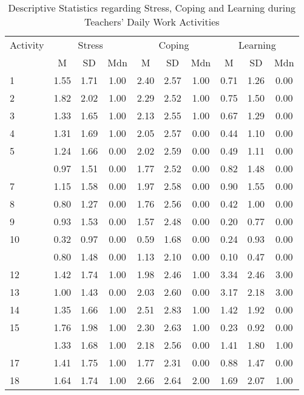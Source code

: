 \documentclass[
]{article}
\begin{document}
\begin{longtable}[t]{lccccccccc}
\caption{\label{tab:rq1 kable table}Descriptive Statistics regarding Stress, Coping and Learning during Teachers' Daily Work Activities}\\
\toprule
\multicolumn{1}{c}{Activity} & \multicolumn{3}{c}{Stress} & \multicolumn{3}{c}{Coping} & \multicolumn{3}{c}{Learning} \\
\cmidrule(l{3pt}r{3pt}){1-1} \cmidrule(l{3pt}r{3pt}){2-4} \cmidrule(l{3pt}r{3pt}){5-7} \cmidrule(l{3pt}r{3pt}){8-10}
 & M & SD & Mdn & M & SD & Mdn & M & SD & Mdn\\
\midrule
1 & 1.55 & 1.71 & 1.00 & 2.40 & 2.57 & 1.00 & 0.71 & 1.26 & 0.00\\
2 & 1.82 & 2.02 & 1.00 & 2.29 & 2.52 & 1.00 & 0.75 & 1.50 & 0.00\\
3 & 1.33 & 1.65 & 1.00 & 2.13 & 2.55 & 1.00 & 0.67 & 1.29 & 0.00\\
4 & 1.31 & 1.69 & 1.00 & 2.05 & 2.57 & 0.00 & 0.44 & 1.10 & 0.00\\
5 & 1.24 & 1.66 & 0.00 & 2.02 & 2.59 & 0.00 & 0.49 & 1.11 & 0.00\\
\addlinespace
6 & 0.97 & 1.51 & 0.00 & 1.77 & 2.52 & 0.00 & 0.82 & 1.48 & 0.00\\
7 & 1.15 & 1.58 & 0.00 & 1.97 & 2.58 & 0.00 & 0.90 & 1.55 & 0.00\\
8 & 0.80 & 1.27 & 0.00 & 1.76 & 2.56 & 0.00 & 0.42 & 1.00 & 0.00\\
9 & 0.93 & 1.53 & 0.00 & 1.57 & 2.48 & 0.00 & 0.20 & 0.77 & 0.00\\
10 & 0.32 & 0.97 & 0.00 & 0.59 & 1.68 & 0.00 & 0.24 & 0.93 & 0.00\\
\addlinespace
11 & 0.80 & 1.48 & 0.00 & 1.13 & 2.10 & 0.00 & 0.10 & 0.47 & 0.00\\
12 & 1.42 & 1.74 & 1.00 & 1.98 & 2.46 & 1.00 & 3.34 & 2.46 & 3.00\\
13 & 1.00 & 1.43 & 0.00 & 2.03 & 2.60 & 0.00 & 3.17 & 2.18 & 3.00\\
14 & 1.35 & 1.66 & 1.00 & 2.51 & 2.83 & 1.00 & 1.42 & 1.92 & 0.00\\
15 & 1.76 & 1.98 & 1.00 & 2.30 & 2.63 & 1.00 & 0.23 & 0.92 & 0.00\\
\addlinespace
16 & 1.33 & 1.68 & 1.00 & 2.18 & 2.56 & 0.00 & 1.41 & 1.80 & 1.00\\
17 & 1.41 & 1.75 & 1.00 & 1.77 & 2.31 & 0.00 & 0.88 & 1.47 & 0.00\\
18 & 1.64 & 1.74 & 1.00 & 2.66 & 2.64 & 2.00 & 1.69 & 2.07 & 1.00\\

\end{longtable}
\end{document}
